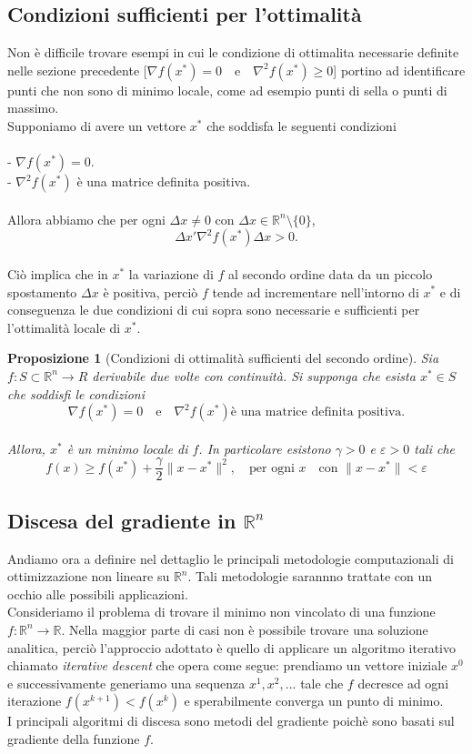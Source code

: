 \documentclass[a4paper, 12pt]{article}
\newtheorem{prop}{Proposizione}
\begin{document}
\subsection{Condizioni sufficienti per l'ottimalità}
Non è difficile trovare esempi in cui le condizione di ottimalita necessarie definite nelle sezione precedente
[$\nabla f(x^\ast) = 0 \quad \mbox{e} \quad \nabla^2 f(x^\ast) \geq 0$]
portino ad identificare punti che non sono di minimo locale, come ad esempio punti di sella o punti di massimo.\\
Supponiamo di avere un vettore $x^\ast$ che soddisfa le seguenti condizioni\\\\
- $\nabla f(x^\ast) = 0$.\\
- $\nabla^2 f(x^\ast)$ è una matrice definita positiva.\\\\
Allora abbiamo che per ogni $\Delta x \neq 0$ con $\Delta x \in \mathbb{R}^n \setminus \{0\}$,\\
\[\Delta x' \nabla^2f(x^\ast) \Delta x > 0.\]\\
Ciò implica che in $x^\ast$ la variazione di $f$ al secondo ordine data da un piccolo spostamento $\Delta x$ è positiva, perciò $f$ tende ad incrementare nell'intorno di $x^\ast$ e di conseguenza le due condizioni di cui sopra sono necessarie e sufficienti per l'ottimalità locale di $x^\ast$.
\begin{prop}[Condizioni di ottimalità sufficienti del secondo ordine] Sia $f:S \subset \mathbb{R}^n \to R$ derivabile due volte con continuità. Si supponga che esista $x^\ast \in S$ che soddisfi le condizioni\\
\[\nabla f(x^\ast) = 0 \quad \mbox{e} \quad \nabla^2 f(x^\ast) \mbox{è una matrice definita positiva.}\]\\
Allora, $x^\ast$ è un minimo locale di $f$. In particolare esistono $\gamma > 0$ e $\varepsilon > 0$ tali che\\
\[ f(x) \geq f(x^\ast) + \frac{\gamma}{2} \| x - x^\ast \|^2, \quad \mbox{per ogni } x \quad \mbox{con } \| x - x^\ast \| < \varepsilon  \]
\end{prop}
\subsection{Discesa del gradiente in $\mathbb{R}^n$}
Andiamo ora a definire nel dettaglio le principali metodologie computazionali di ottimizzazione non lineare su $\mathbb{R}^n$. Tali metodologie sarannno trattate con un occhio alle possibili applicazioni.\\
Consideriamo il problema di trovare il minimo non vincolato di una funzione $f:\mathbb{R}^n \to \mathbb{R}$. Nella maggior parte di casi non è possibile trovare una soluzione analitica, perciò l'approccio adottato è quello di applicare un algoritmo iterativo chiamato \textit{iterative descent} che opera come segue: prendiamo un vettore iniziale $x^0$ e successivamente generiamo una sequenza $x^1, x^2, ...$ tale che $f$ decresce ad ogni iterazione $f(x^{k+1}) < f(x^k)$ e sperabilmente converga un punto di minimo.\\
I principali algoritmi di discesa sono metodi del gradiente poichè sono basati sul gradiente della funzione $f$.
\end{document}

